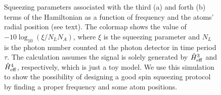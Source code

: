 \begin{figure}[!tbp]
\begin{minipage}{.91\linewidth}
\centering
{}
\end{minipage}
\par\medskip
\begin{minipage}{.91\linewidth}
\centering
{}
\end{minipage}
\caption[Squeezing parameters as a function of frequency and the atoms' radial position using a scalar polarizability in a toy model.]{Squeezing parameters associated with the third (a) and forth (b) terms of the Hamiltonian as a function of frequency and the atoms' radial position (see text). The colormap shows the value of $ -10\log_{10}(\xi/N_LN_A) $, where $ \xi $ is the squeezing parameter and $ N_L $ is the photon number counted at the photon detector in time period $ \tau $. The calculation assumes the signal is solely generated by $ \hat{H}^3_{\rm eff} $ and $ \hat{H}^4_{\rm eff} $, respectively, which is just a toy model. We use this simulation to show the possibility of designing a good spin squeezing protocol by finding a proper frequency and some atom positions. }
\label{fig:squeezingparaTerms}
\end{figure}

